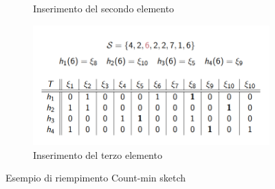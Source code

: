 \begin{figure}[!ht]
\begin{subfigure}[b]{0.45\textwidth}
        \caption{Inserimento del secondo elemento}
    \end{subfigure}
    \hfill
    \begin{subfigure}[b]{0.45\textwidth}
        \centering
        \includegraphics[width=\textwidth]{img/hash/CMS4.png}
        \caption{Inserimento del terzo elemento}
    \end{subfigure}
    \caption{Esempio di riempimento Count-min sketch}
\end{figure}